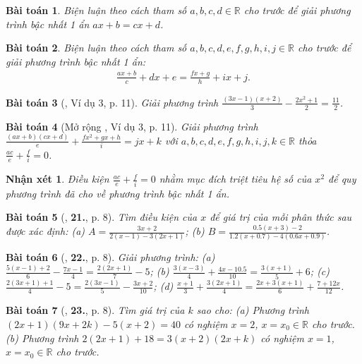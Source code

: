 \documentclass{article}
\numberwithin{equation}{section}
\newtheorem{baitoan}{Bài toán}
\newtheorem{nhanxet}{Nhận xét}[section]
\begin{document}
\begin{baitoan}
	Biện luận theo cách tham số $a,b,c,d\in\mathbb{R}$ cho trước để giải phương trình bậc nhất 1 ẩn $ax + b = cx + d$.
\end{baitoan}

\begin{baitoan}
	Biện luận theo cách tham số $a,b,c,d,e,f,g,h,i,j\in\mathbb{R}$ cho trước để giải phương trình bậc nhất 1 ẩn:
	\begin{align*}
		\frac{ax + b}{c} + dx + e = \frac{fx + g}{h} + ix + j.
	\end{align*}
\end{baitoan}

\begin{baitoan}[\cite{SGK_Toan_8_tap_2}, Ví dụ 3, p. 11]
	Giải phương trình $\frac{(3x - 1)(x + 2)}{3} - \frac{2x^2 + 1}{2} = \frac{11}{2}$.
\end{baitoan}

\begin{baitoan}[Mở rộng \cite{SGK_Toan_8_tap_2}, Ví dụ 3, p. 11]
	Giải phương trình $\frac{(ax + b)(cx + d)}{e} + \frac{fx^2 + gx + h}{i} = jx + k$ với $a,b,c,d,e,f,g,h,i,j,k\in\mathbb{R}$ thỏa $\frac{ac}{e} + \frac{f}{i} = 0$.
\end{baitoan}

\begin{nhanxet}
	Điều kiện $\frac{ac}{e} + \frac{f}{i} = 0$ nhằm mục đích triệt tiêu hệ số của $x^2$ để quy phương trình đã cho về phương trình bậc nhất 1 ẩn.
\end{nhanxet}

\begin{baitoan}[\cite{SBT_Toan_8_tap_2}, \textbf{21.}, p. 8]
	Tìm điều kiện của $x$ để giá trị của mỗi phân thức sau được xác định: (a) $A = \frac{3x + 2}{2(x - 1) - 3(2x + 1)}$; (b) $B = \frac{0.5(x + 3) - 2}{1.2(x + 0.7) - 4(0.6x + 0.9)}$.
\end{baitoan}

\begin{baitoan}[\cite{SBT_Toan_8_tap_2}, \textbf{22.}, p. 8]
	Giải phương trình: (a) $\frac{5(x - 1) + 2}{6} - \frac{7x - 1}{4} = \frac{2(2x + 1)}{7} - 5$; (b) $\frac{3(x - 3)}{4} + \frac{4x - 10.5}{10} = \frac{3(x + 1)}{5} + 6$; (c) $\frac{2(3x + 1) + 1}{4} - 5 = \frac{2(3x - 1)}{5} - \frac{3x + 2}{10}$; (d) $\frac{x + 1}{3} + \frac{3(2x + 1)}{4} = \frac{2x + 3(x + 1)}{6} + \frac{7 + 12x}{12}$.
\end{baitoan}

\begin{baitoan}[\cite{SBT_Toan_8_tap_2}, \textbf{23.}, p. 8]
	Tìm giá trị của $k$ sao cho: (a) Phương trình $(2x + 1)(9x + 2k) - 5(x + 2) = 40$ có nghiệm $x = 2$, $x = x_0\in\mathbb{R}$ cho trước. (b) Phương trình $2(2x + 1) + 18 = 3(x + 2)(2x + k)$ có nghiệm $x = 1$, $x = x_0\in\mathbb{R}$ cho trước.
\end{baitoan}
\end{document}
